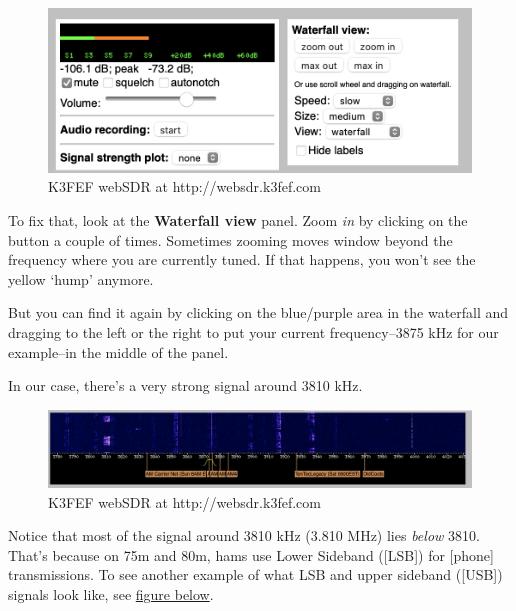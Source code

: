 \documentclass[
  letterpaper,
  DIV=11,
  numbers=noendperiod]{scrreport}
\begin{document}
\begin{figure}

{\centering \includegraphics{include/img/k3fef-websdr-panel-2.png}

}

\caption{K3FEF webSDR at http://websdr.k3fef.com}

\end{figure}

To fix that, look at the \textbf{Waterfall view} panel. Zoom \emph{in}
by clicking on the button a couple of times. Sometimes zooming moves
window beyond the frequency where you are currently tuned. If that
happens, you won't see the yellow `hump' anymore.

But you can find it again by clicking on the blue/purple area in the
waterfall and dragging to the left or the right to put your current
frequency--3875 kHz for our example--in the middle of the panel.

In our case, there's a very strong signal around 3810 kHz.

\begin{figure}

{\centering \includegraphics{include/img/k3fef-websdr-3875.png}

}

\caption{K3FEF webSDR at http://websdr.k3fef.com}

\end{figure}

Notice that most of the signal around 3810 kHz (3.810 MHz) lies
\emph{below} 3810. That's because on 75m and 80m, hams use Lower
Sideband ({[}LSB{]}) for {[}phone{]} transmissions. To see another
example of what LSB and upper sideband ({[}USB{]}) signals look like,
see \protect\hyperlink{fig:hf-signals}{figure below}.
\end{document}
